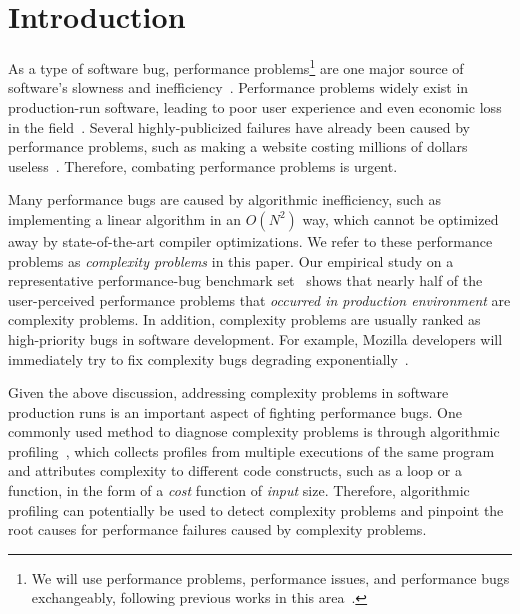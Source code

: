 \section{Introduction}
\label{sec:intro}


As a type of software bug, performance problems\footnote{We will use performance problems,
performance issues,  and performance bugs exchangeably,
following previous works in this area~\cite{SongOOPSLA2014,ldoctor}.}
are one major source of software's slowness and inefficiency~\cite{PerfBug,perf.fse10,SongOOPSLA2014,ldoctor,Alabama}. 
Performance problems widely exist in production-run software, leading to
poor user experience and  even economic loss in the field~\cite{PerfBug,SongOOPSLA2014,ldoctor}. 
Several highly-publicized failures have already been caused by performance problems,
such as making a website costing millions of dollars useless~\cite{ACA-health}.
Therefore, combating performance problems is urgent.


Many performance bugs are caused by algorithmic inefficiency,
such as implementing a linear algorithm in an $O(N^2)$ way, 
which cannot be optimized away by state-of-the-art 
compiler optimizations. 
We refer to these performance problems as \emph{complexity problems}  in this paper. 
Our empirical study on a representative performance-bug
benchmark set~\cite{PerfBug,SongOOPSLA2014} shows that
nearly half of the user-perceived performance problems that
\emph{occurred in production environment} are complexity problems.
In addition, complexity problems are usually ranked as high-priority bugs in 
software development.  For example, Mozilla developers will immediately try to fix 
complexity bugs degrading exponentially~\cite{mozilla35294}.


Given the above discussion, addressing complexity problems in
software production runs is an important aspect of fighting performance bugs. 
One commonly used method to diagnose complexity problems
is through algorithmic profiling~\cite{Aprof1,Aprof2,AlgoProf},
which collects profiles from multiple
executions of the same program and attributes complexity to different code constructs, 
such as a loop or a function, in the form of a \textit{cost} function of \textit{input} size.
Therefore, algorithmic profiling can potentially be used to detect complexity problems and
pinpoint the root causes for performance failures caused by complexity problems. 



